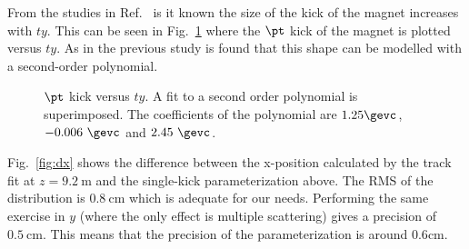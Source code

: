 From the studies in  Ref.~\cite{VanTilburg:691686} is it known the
size of the kick of the magnet increases with $ty$. This can be seen
in Fig.~\ref{fig:by} where the $\pt$ kick of the magnet is plotted
versus $ty$. As in the previous study is found that this shape can be
modelled with a second-order polynomial.
\begin{figure}[htb!]
\begin{center}
\caption{\small $\pt$ kick versus $ty$. A fit to a second order
  polynomial is superimposed. The coefficients of the polynomial are $1.25
  \gevc$, $-0.006~\gevc$ and $2.45~\gevc$. }
\label{fig:by}
\end{center}
\end{figure}

Fig.~\ref{fig:dx} shows the difference between the x-position
calculated by the track fit at $z = 9.2~\textrm{m}$ and the single-kick
parameterization above. The RMS of the distribution is $0.8 ~\textrm{cm}$
which is adequate for our needs. Performing the same exercise
in $y$ (where the only effect is multiple scattering) gives a precision of $0.5~\textrm{cm}$. This means that
the precision of the parameterization is around $0.6 \textrm{cm}$. 

